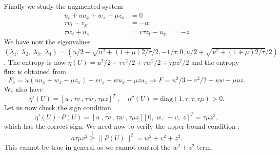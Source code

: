 \documentclass{article}
\theoremstyle{plain}
\theoremstyle{definition}
\numberwithin{theorem}{section}
\begin{document}
 

Finally we  study   the augmented system
\begin{subequations} \label{vkdvh3}
\begin{align}
    u_t +  u u_x  + w_x -\mu z_x & = 0 \\
    \tau v_t - v_x & = -w\\
        \tau w_t  + u_x  & = v
            \tau z_t - u_x & = -z 
\end{align}
\end{subequations}
We have now the eigenvalues $(\lambda_1,\;\lambda_2,\;\lambda_3,\;\lambda_4)=(u/2 - \sqrt{u^2+(1+\mu)2/\tau}/2, -1/\tau, 0 , u/2 + \sqrt{u^2+(1+\mu)2/\tau}/2)$.
The entropy is now $\eta(U) =u^2/2 + \tau v^2/2 + \tau w^2/2 +\tau  \mu  z^2/2$ and the entropy flux is obtained from
$$
F_x = u( u u_x  + w_x -\mu z_x) - vv_x +wu_x -\mu z u_x  \Rightarrow  F=u^3/3  -v^2/2 + uw -\mu uz.
$$
We also have 
$$
\eta'(U)= [u\;, \tau v\;, \tau w\;, \tau\mu z]^T\;,\quad 
\eta''(U) =  \text{diag}(1,\tau,\tau,\tau \mu) >0.
$$
Let us now check the  sign  condition
$$
\eta'(U)\cdot P(U) = [u\;, \tau v\;, \tau w\;, \tau\mu z] [ 0,\; w,\; -v,\; z ]^T = \tau \mu z^2 ,
$$
which has the correct sign. We need now to verify the upper bound  condition :
$$
  a \tau \mu   v^2 \stackrel{?}{\ge} \|P(U)\|^2 = w^2 + v^2 + z^2 .
$$
This cannot be true in general as we cannot control the $w^2 + z^2$ term.

%
%
%
\end{document}
